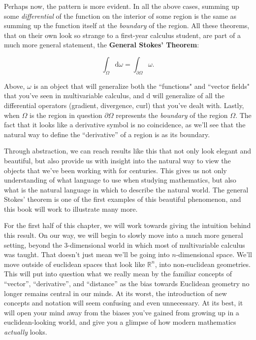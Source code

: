 \documentclass[../master.tex]{subfiles}
\begin{document}
	Perhaps now, the pattern is more evident. In all the above cases, summing up some \emph{differential} of the function on the interior of some region is the same as summing up the function itself at the \emph{boundary} of the region. All these theorems, that on their own look so strange to a first-year calculus student, are part of a much more general statement, the \textbf{General Stokes' Theorem}:

	\begin{theorem}\label{thm:GeneralStokes}
		\begin{equation} \label{eq:GeneralStokes}
			\int_\Omega \mathrm d \omega = \int_{\partial \Omega} \omega.
		\end{equation}
	\end{theorem}

	

	
	Above, $\omega$ is an object that will generalize both the ``functions" and ``vector fields" that you've seen in multivariable calculus, and $\mathrm d$ will generalize of all the differential operators (gradient, divergence, curl) that you've dealt with. Lastly, when $\Omega$ is the region in question $\partial \Omega$ represents the \emph{boundary} of the region $\Omega$. The fact that it looks like a derivative symbol is no coincidence, as we'll see that the natural way to define the ``derivative'' of a region is as its boundary.
	
	
	Through abstraction, we can reach results like this that not only look elegant and beautiful, but also provide us with insight into the natural way to view the objects that we've been working with for centuries. This gives us not only understanding of what language to use when studying mathematics, but also what is the natural language in which to describe the natural world. The general Stokes' theorem is one of the first examples of this beautiful phenomenon, and this book will work to illustrate many more. 
	
	
	For the first half of this chapter, we will work towards giving the intuition behind  this result. On our way, we will begin to slowly move into a much more general setting, beyond the $3$-dimensional world in which most of multivariable calculus was taught. That doesn't just mean we'll be going into $n$-dimensional space. We'll move outside of euclidean spaces that look like $\mathbb{R}^n$, into non-euclidean geometries. This will put into question what we really mean by the familiar concepts of ``vector'', ``derivative'', and ``distance'' as the bias towards Euclidean geometry no longer remains central in our minds. At its worst, the introduction of new concepts and notation will seem confusing and even unnecessary. At its best, it will open your mind away from the biases you've gained from growing up in a euclidean-looking world, and give you a glimpse of how modern mathematics \emph{actually} looks. 
	
\end{document}
